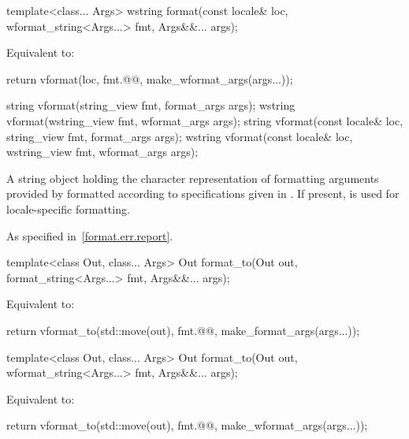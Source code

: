 %
\begin{itemdecl}
template<class... Args>
  wstring format(const locale& loc, wformat_string<Args...> fmt, Args&&... args);
\end{itemdecl}

\begin{itemdescr}
\pnum
\effects
Equivalent to:
\begin{codeblock}
return vformat(loc, fmt.@@, make_wformat_args(args...));
\end{codeblock}
\end{itemdescr}

%
\begin{itemdecl}
string vformat(string_view fmt, format_args args);
wstring vformat(wstring_view fmt, wformat_args args);
string vformat(const locale& loc, string_view fmt, format_args args);
wstring vformat(const locale& loc, wstring_view fmt, wformat_args args);
\end{itemdecl}

\begin{itemdescr}
\pnum
\returns
A string object holding the character representation of
formatting arguments provided by  formatted according to
specifications given in .
If present,  is used for locale-specific formatting.

\pnum
\throws
As specified in~\ref{format.err.report}.
\end{itemdescr}

%
\begin{itemdecl}
template<class Out, class... Args>
  Out format_to(Out out, format_string<Args...> fmt, Args&&... args);
\end{itemdecl}

\begin{itemdescr}
\pnum
\effects
Equivalent to:
\begin{codeblock}
return vformat_to(std::move(out), fmt.@@, make_format_args(args...));
\end{codeblock}
\end{itemdescr}

%
\begin{itemdecl}
template<class Out, class... Args>
  Out format_to(Out out, wformat_string<Args...> fmt, Args&&... args);
\end{itemdecl}

\begin{itemdescr}
\pnum
\effects
Equivalent to:
\begin{codeblock}
return vformat_to(std::move(out), fmt.@@, make_wformat_args(args...));
\end{codeblock}
\end{itemdescr}

